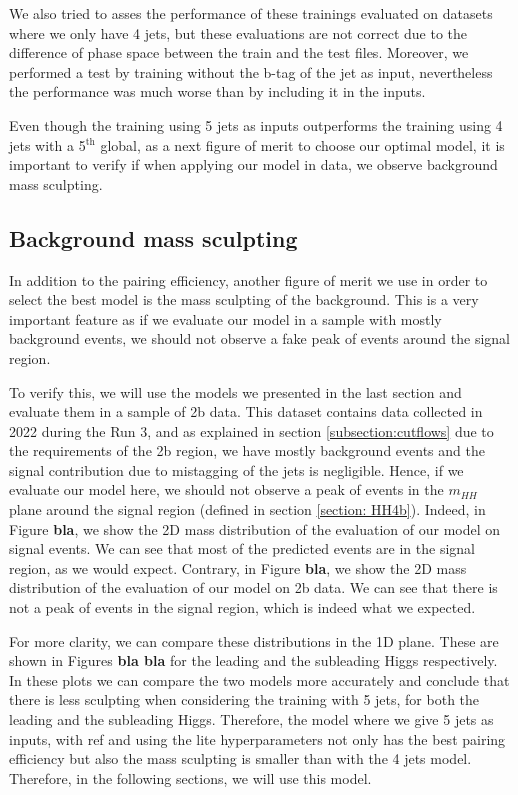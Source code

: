We also tried to asses the performance of these trainings evaluated on datasets where we only have 4 jets, but these evaluations are not correct due to the difference of phase space between the train and the test files. Moreover, we performed a test by training without the b-tag of the jet as input, nevertheless the performance was much worse than by including it in the inputs.

Even though the training using 5 jets as inputs outperforms the training using 4 jets with a 5$^{\text{th}}$ global, as a next figure of merit to choose our optimal model, it is important to verify if when applying our model in data, we observe background mass sculpting.

\newpage

\subsection{Background mass sculpting}
In addition to the pairing efficiency, another figure of merit we use in order to select the best model is the mass sculpting of the background. This is a very important feature as if we evaluate our model in a sample with mostly background events, we should not observe a fake peak of events around the signal region. 

To verify this, we will use the models we presented in the last section and evaluate them in a sample of 2b data. This dataset contains data collected in 2022 during the Run 3, and as explained in section \ref{subsection:cutflows} due to the requirements of the 2b region, we have mostly background events and the signal contribution due to mistagging of the jets is negligible. Hence, if we evaluate our model here, we should not observe a peak of events in the $m_{HH}$ plane around the signal region (defined in section \ref{section: HH4b}). Indeed, in Figure \textbf{bla}, we show the 2D mass distribution of the evaluation of our model on signal events. We can see that most of the predicted events are in the signal region, as we would expect. Contrary, in Figure \textbf{bla}, we show the 2D mass distribution of the evaluation of our model on 2b data. We can see that there is not a peak of events in the signal region, which is indeed what we expected. 


For more clarity, we can compare these distributions in the 1D plane. These are shown in Figures \textbf{bla bla} for the leading and the subleading Higgs respectively. In these plots we can compare the two models more accurately and conclude that there is less sculpting when considering the training with 5 jets, for both the leading and the subleading Higgs. Therefore, the model where we give 5 jets as inputs, with \pt ref and using the lite hyperparameters not only has the best pairing efficiency but also the mass sculpting is smaller than with the 4 jets model. Therefore, in the following sections, we will use this model.

